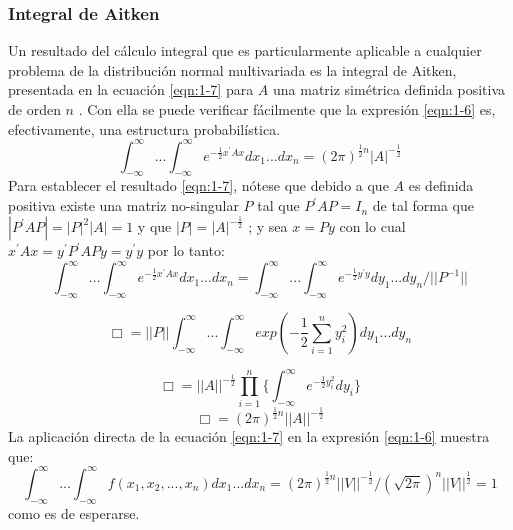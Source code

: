 \subsubsection{Integral de Aitken}
Un resultado del cálculo integral que es particularmente aplicable a cualquier problema de la distribución normal multivariada es la integral de Aitken, presentada en la ecuación \ref{eqn:1-7} para  $A$ una matriz simétrica definida positiva de orden $n$ .  Con ella se puede verificar fácilmente que la expresión \ref{eqn:1-6} es, efectivamente, una estructura probabilística. 
\begin{equation}
    \int_{-\infty}^\infty...\int_{-\infty}^{\infty} e^{-\frac{1}{2} x^\prime Ax} dx_1...dx_n =(2\pi)^{\frac{1}{2}n} |A|^{-\frac{1}{2}}
    \label{eqn:1-7}
\end{equation}
Para establecer el resultado \ref{eqn:1-7}, nótese que debido a que  $A$ es definida positiva existe una matriz no-singular  $P$ tal que $P^\prime AP=I_n$  de tal forma que $|P^\prime AP|=|P|^2|A|=1$  y que $|P|=|A|^{-\frac{1}{2}}$ ; y sea  $x=Py$  con lo cual $x^\prime Ax=y^\prime P^\prime APy=y^\prime y$  por lo tanto:
 \begin{equation*}
     \int^{\infty}_{-\infty}...\int^{\infty}_{-\infty} e^{-\frac{1}{2}x^\prime Ax}dx_1...dx_n=\int^{\infty}_{-\infty}...\int^{\infty}_{-\infty} e^{-\frac{1}{2}y^\prime y}dy_1...dy_n/||P^{-1}||
 \end{equation*}
 
 \begin{equation*}
 \Box =||P||\int^{\infty}_{-\infty}...\int^{\infty}_{-\infty} exp(-\frac{1}{2}\sum^{n}_{i=1}y_i^{2})dy_1...dy_n    
 \end{equation*}
 
 \begin{equation*}
 \Box =||A||^{-\frac{1}{2}} \prod_{i=1}^{n}\{ \int^{\infty}_{-\infty}e^{-\frac{1}{2}y_i^{2}}dy_i\} 
 \end{equation*}
  \begin{equation*}
 \Box =(2\pi)^{\frac{1}{2}n}||A||^{-\frac{1}{2}}
 \end{equation*}
 La aplicación directa de la ecuación \ref{eqn:1-7} en la expresión \ref{eqn:1-6} muestra que:
 \begin{equation*}
     \int^{\infty}_{-\infty}...\int^{\infty}_{-\infty} f(x_1,x_2,...,x_n)dx_1...dx_n=(2\pi)^{\frac{1}{2}n}||V||^{-\frac{1}{2}}/(\sqrt{2\pi})^{n}||V||^{\frac{1}{2}}=1
 \end{equation*}
 como es de esperarse. 
